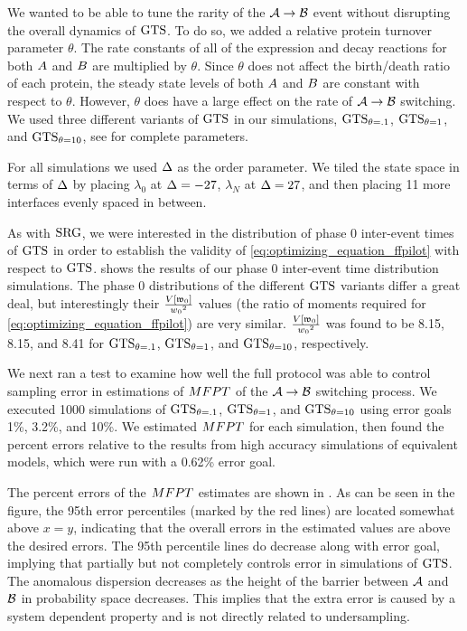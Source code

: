 We wanted to be able to tune the rarity of the $\mathcal{A} \rightarrow \mathcal{B}$ event without disrupting the overall dynamics of $\text{GTS}$. To do so, we added a relative protein turnover parameter $\theta$. The rate constants of all of the expression and decay reactions for both $A$ and $B$ are multiplied by $\theta$. Since $\theta$ does not affect the birth/death ratio of each protein, the steady state levels of both $A$ and $B$ are constant with respect to $\theta$. However, $\theta$ does have a large effect on the rate of $\mathcal{A} \rightarrow \mathcal{B}$ switching. We used three different variants of $\text{GTS}$ in our simulations, $\text{GTS}_{\theta=.1}$, $\text{GTS}_{\theta=1}$, and $\text{GTS}_{\theta=10}$, see  for complete parameters.

For all  simulations we used $\Delta$ as the order parameter. We tiled the state space in terms of $\Delta$ by placing $\lambda_0$ at $\Delta = -27$, $\lambda_N$ at $\Delta = 27$, and then placing 11 more interfaces evenly spaced in between.

As with $\text{SRG}$, we were interested in the distribution of phase 0 inter-event times of $\text{GTS}$ in order to establish the validity of \eqref{eq:optimizing_equation_ffpilot} with respect to $\text{GTS}$.  shows the results of our phase 0 inter-event time distribution simulations. The phase 0 distributions of the different $\text{GTS}$ variants differ a great deal, but interestingly their $\frac{V \left[ \mathfrak{w}_{0} \right]}{w_{0} {}^2}$ values (the ratio of moments required for \eqref{eq:optimizing_equation_ffpilot}) are very similar. $\frac{V \left[ \mathfrak{w}_{0} \right]}{w_{0} {}^2}$ was found to be 8.15, 8.15, and 8.41 for $\text{GTS}_{\theta=.1}$, $\text{GTS}_{\theta=1}$, and $\text{GTS}_{\theta=10}$, respectively.

We next ran a test to examine how well the full  protocol was able to control sampling error in estimations of $MFPT$ of the $\mathcal{A} \rightarrow \mathcal{B}$ switching process. We executed 1000  simulations of $\text{GTS}_{\theta=.1}$, $\text{GTS}_{\theta=1}$, and $\text{GTS}_{\theta=10}$ using error goals 1\%, 3.2\%, and 10\%. We estimated $MFPT$ for each simulation, then found the percent errors relative to the results from high accuracy  simulations of equivalent models, which were run with a 0.62\% error goal.

The percent errors of the $MFPT$ estimates are shown in . As can be seen in the figure, the 95th error percentiles (marked by the red lines) are located somewhat above $x=y$, indicating that the overall errors in the estimated  values are above the desired errors. The 95th percentile lines do decrease along with error goal, implying that  partially but not completely controls error in simulations of $\text{GTS}$. The anomalous dispersion decreases as the height of the barrier between $\mathcal{A}$ and $\mathcal{B}$ in probability space decreases. This implies that the extra error is caused by a system dependent property and is not directly related to undersampling.

